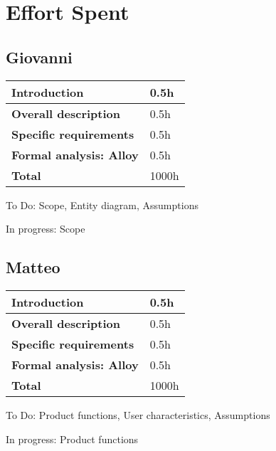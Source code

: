 \section{Effort Spent}
\subsection*{Giovanni}
\begin{table}[h]
    \begin{tabular}{|l|l|}
        \toprule
        \textbf{Introduction}           & 0.5h  \\ \midrule
        \textbf{Overall description}    & 0.5h  \\ \midrule
        \textbf{Specific requirements}  & 0.5h  \\ \midrule
        \textbf{Formal analysis: Alloy} & 0.5h  \\ \midrule
        \textbf{Total}                  & 1000h \\ \bottomrule
    \end{tabular}
\end{table}

To Do: Scope, Entity diagram, Assumptions

In progress: Scope

\subsection*{Matteo}
\begin{table}[h]
    \begin{tabular}{|l|l|}
        \toprule
        \textbf{Introduction}           & 0.5h  \\ \midrule
        \textbf{Overall description}    & 0.5h  \\ \midrule
        \textbf{Specific requirements}  & 0.5h  \\ \midrule
        \textbf{Formal analysis: Alloy} & 0.5h  \\ \midrule
        \textbf{Total}                  & 1000h \\ \bottomrule
    \end{tabular}
\end{table}
To Do: Product functions, User characteristics, Assumptions

In progress: Product functions

